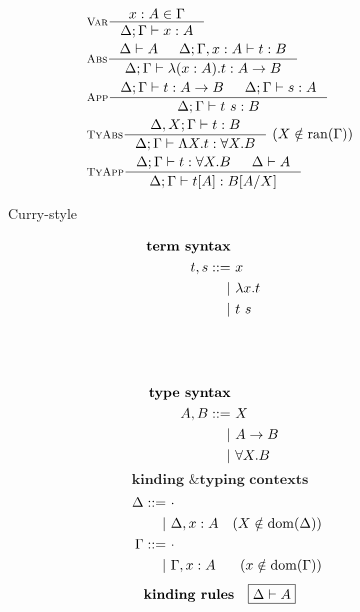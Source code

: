 \begin{figure}
\begin{singlespace}
\begin{minipage}{.46\textwidth}
\vspace*{-1em}
\begin{align*}
& \inference[\sc Var]{x:A \in \Gamma}{\Delta;\Gamma |- x:A} \\
& \inference[\sc Abs]{\Delta |- A & \Delta;\Gamma,x:A |- t : B}
	             {\Delta;\Gamma |- \l(x:A).t : A -> B} \\
& \inference[\sc App]{\Delta;\Gamma |- t : A -> B & \Delta;\Gamma |- s : A}
		     {\Delta;\Gamma |- t~s : B} \\
& \inference[\sc TyAbs]{\Delta,X;\Gamma |- t : B}
		       {\Delta;\Gamma |- \L X.t : \forall X.B} ~
		       (X\notin\ran(\Gamma)) \\
& \inference[\sc TyApp]{\Delta;\Gamma |- t : \forall X.B & \Delta |- A}
		       {\Delta;\Gamma |- t[A] : B[A/X]}
\end{align*}
\end{minipage}
\begin{minipage}{.46\textwidth}
	\begin{center}Curry-style\end{center}
\def\baselinestretch{0}
\small
\begin{align*}
\textbf{term syntax} \\
t,s ::= &~ x           \\
      | &~ \l x    . t \\
      | &~ t ~ s       \\
        &~\phantom{| \L X}  \\
        &~\phantom{| t [A]\vspace*{.1em}} \\
\\
\textbf{type syntax} \\
A,B ::= &~ X \\
      | &~ A -> B \\
      | &~ \forall X . B \\
\end{align*}
\[ \textbf{kinding \& typing contexts} \]\vspace*{-1em}
\begin{align*}\quad
\Delta ::= &~ \cdot \\
	 | &~ \Delta, x:A & (X\notin \mathop{\mathrm{dom}}(\Delta)) \\
\Gamma ::= &~ \cdot \\
	 | &~ \Gamma, x:A & (x\notin \mathop{\mathrm{dom}}(\Gamma)) \\
\end{align*}
\[ \textbf{kinding rules} \quad \framebox{$ \Delta |- A $}\]\vspace*{-1em}

\end{minipage}
\end{singlespace}
\end{figure}
